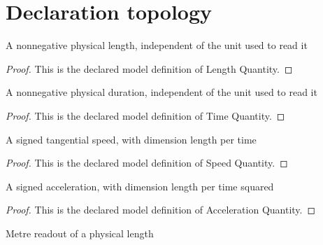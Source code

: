 \section{Declaration topology}
\begin{definition}
  \label{def:physics:phyx-mini-0675:phyxminiproblems-problemphyxmini0675-lengthquantity}
  A nonnegative physical length, independent of the unit used to read it
\end{definition}
\begin{proof}
  This is the declared model definition of Length Quantity.
\end{proof}
\begin{definition}
  \label{def:physics:phyx-mini-0675:phyxminiproblems-problemphyxmini0675-timequantity}
  A nonnegative physical duration, independent of the unit used to read it
\end{definition}
\begin{proof}
  This is the declared model definition of Time Quantity.
\end{proof}
\begin{definition}
  \label{def:physics:phyx-mini-0675:phyxminiproblems-problemphyxmini0675-speedquantity}
  A signed tangential speed, with dimension length per time
\end{definition}
\begin{proof}
  This is the declared model definition of Speed Quantity.
\end{proof}
\begin{definition}
  \label{def:physics:phyx-mini-0675:phyxminiproblems-problemphyxmini0675-accelerationquantity}
  A signed acceleration, with dimension length per time squared
\end{definition}
\begin{proof}
  This is the declared model definition of Acceleration Quantity.
\end{proof}
\begin{definition}
  \label{def:physics:phyx-mini-0675:phyxminiproblems-problemphyxmini0675-lengthinmeters}
  Metre readout of a physical length
\end{definition}
